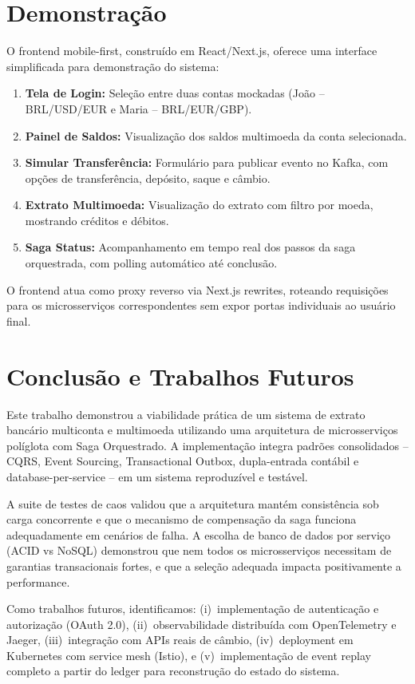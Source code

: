 \documentclass[12pt]{article}
\begin{document}
\section{Demonstra\c{c}\~{a}o}

O frontend mobile-first, constru\'{i}do em React/Next.js, oferece uma interface simplificada para demonstra\c{c}\~{a}o do sistema:

\begin{enumerate}[noitemsep]
  \item \textbf{Tela de Login:} Sele\c{c}\~{a}o entre duas contas mockadas (Jo\~{a}o -- BRL/USD/EUR e Maria -- BRL/EUR/GBP).
  \item \textbf{Painel de Saldos:} Visualiza\c{c}\~{a}o dos saldos multimoeda da conta selecionada.
  \item \textbf{Simular Transfer\^{e}ncia:} Formul\'{a}rio para publicar evento no Kafka, com op\c{c}\~{o}es de transfer\^{e}ncia, dep\'{o}sito, saque e c\^{a}mbio.
  \item \textbf{Extrato Multimoeda:} Visualiza\c{c}\~{a}o do extrato com filtro por moeda, mostrando cr\'{e}ditos e d\'{e}bitos.
  \item \textbf{Saga Status:} Acompanhamento em tempo real dos passos da saga orquestrada, com polling autom\'{a}tico at\'{e} conclus\~{a}o.
\end{enumerate}

O frontend atua como proxy reverso via Next.js rewrites, roteando requisi\c{c}\~{o}es para os microsservi\c{c}os correspondentes sem expor portas individuais ao usu\'{a}rio final.


\section{Conclus\~{a}o e Trabalhos Futuros}

Este trabalho demonstrou a viabilidade pr\'{a}tica de um sistema de extrato banc\'{a}rio multiconta e multimoeda utilizando uma arquitetura de microsservi\c{c}os pol\'{i}glota com Saga Orquestrado. A implementa\c{c}\~{a}o integra padr\~{o}es consolidados -- CQRS, Event Sourcing, Transactional Outbox, dupla-entrada cont\'{a}bil e database-per-service -- em um sistema reproduz\'{i}vel e test\'{a}vel.

A suite de testes de caos validou que a arquitetura mant\'{e}m consist\^{e}ncia sob carga concorrente e que o mecanismo de compensa\c{c}\~{a}o da saga funciona adequadamente em cen\'{a}rios de falha. A escolha de banco de dados por servi\c{c}o (ACID vs NoSQL) demonstrou que nem todos os microsservi\c{c}os necessitam de garantias transacionais fortes, e que a sele\c{c}\~{a}o adequada impacta positivamente a performance.

Como trabalhos futuros, identificamos: (i)~implementa\c{c}\~{a}o de autentica\c{c}\~{a}o e autoriza\c{c}\~{a}o (OAuth 2.0), (ii)~observabilidade distribu\'{i}da com OpenTelemetry e Jaeger, (iii)~integra\c{c}\~{a}o com APIs reais de c\^{a}mbio, (iv)~deployment em Kubernetes com service mesh (Istio), e (v)~implementa\c{c}\~{a}o de event replay completo a partir do ledger para reconstru\c{c}\~{a}o do estado do sistema.




\end{document}
